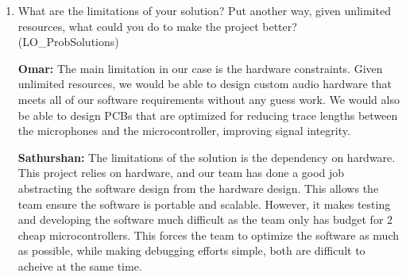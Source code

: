 \documentclass[12pt, titlepage]{article}
\begin{document}
\begin{enumerate}
  \textbf{Sathurshan:} SRS needed to be updated. It was updated because part of
  writing this document required reviewing the SRS. From this, I have found
  parts of the requirements that can be improved based on recent better
  understanding of the system.

  \textbf{Kalp:} The SRS document was updated to reflect the changes that we
  made to the system. A lot of the requirements changes revolved around the
  hardware and software design decisions that we made (ex. choosing to separate
  a process into multiple modules leads to more specific requirements). 
  
  \textbf{Nirmal:} For the classification specific modules, no parts of any
  other documents needed to be changed, since the other documents never
  mentioned any exact implementation details. Which is what this document is
  focused on. 

  \textbf{Jay:} Similar to the others, I found that parts of the SRS needed
  updates. While detailing the modules in this document, it became clear that a
  few requirements could be phrased more precisely or split into smaller pieces
  based on the updated understanding of the system. So the changes mostly came
  from wanting the requirements to better match the actual design.

  \item What are the limitations of your solution?  Put another way, given
  unlimited resources, what could you do to make the project better?
  (LO\_ProbSolutions)

  \textbf{Omar:} The main limitation in our case is the hardware constraints.
  Given unlimited resources, we would be able to design custom audio hardware
  that meets all of our software requirements without any guess work. We would
  also be able to design PCBs that are optimized for reducing trace lengths
  between the microphones and the microcontroller, improving signal integrity. 
  
  \textbf{Sathurshan:} The limitations of the solution is the dependency on
  hardware. This project relies on hardware, and our team has done
  a good job abstracting the software design from the hardware design. This
  allows the team ensure the software is portable and scalable. However, it
  makes testing and developing the software much difficult as the team only has
  budget for 2 cheap microcontrollers. This forces the team to optimize the
  software as much as possible, while making debugging efforts simple, both are
  difficult to acheive at the same time.


\end{enumerate}
\end{document}
